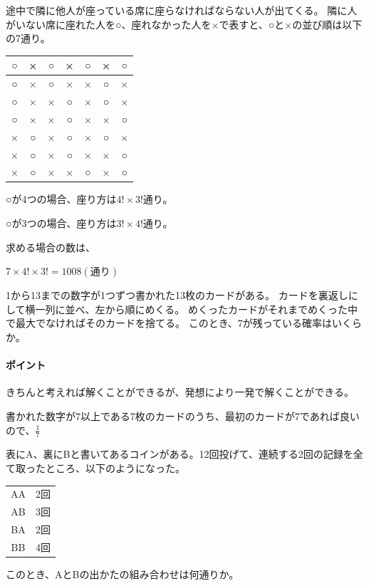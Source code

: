 \documentclass[uplatex,dvipdfmx]{jsbook}
\begin{document}
\begin{answer}
    途中で隣に他人が座っている席に座らなければならない人が出てくる。
    隣に人がいない席に座れた人を○、座れなかった人を×で表すと、○と×の並び順は以下の7通り。

    \begin{tabular}{|ccccccc|}
        \hline
        ○ & × & ○ & × & ○ & × & ○\\\hline
        ○ & × & ○ & × & × & ○ & ×\\\hline
        ○ & × & × & ○ & × & ○ & ×\\\hline
        ○ & × & × & ○ & × & × & ○\\\hline
        × & ○ & × & ○ & × & ○ & ×\\\hline
        × & ○ & × & ○ & × & × & ○\\\hline
        × & ○ & × & × & ○ & × & ○\\\hline
    \end{tabular}

    ○が4つの場合、座り方は$4!\times 3!$通り。

    ○が3つの場合、座り方は$3!\times 4!$通り。

    求める場合の数は、

    $7\times 4!\times 3!=1008(通り)$
\end{answer}

\begin{problem}[練習問題2]
    1から13までの数字が1つずつ書かれた13枚のカードがある。
    カードを裏返しにして横一列に並べ、左から順にめくる。
    めくったカードがそれまでめくった中で最大でなければそのカードを捨てる。
    このとき、7が残っている確率はいくらか。
\end{problem}

\paragraph{ポイント}きちんと考えれば解くことができるが、発想により一発で解くことができる。

\begin{answer}
    書かれた数字が7以上である7枚のカードのうち、最初のカードが7であれば良いので、$\displaystyle\frac{1}{7}$
\end{answer}

\begin{problem}[練習問題3]
    表にA、裏にBと書いてあるコインがある。12回投げて、連続する2回の記録を全て取ったところ、以下のようになった。

    \begin{tabular}{cc}
        AA & 2回\\
        AB & 3回\\
        BA & 2回\\
        BB & 4回\\
    \end{tabular}

    このとき、AとBの出かたの組み合わせは何通りか。
\end{problem}
\end{document}
